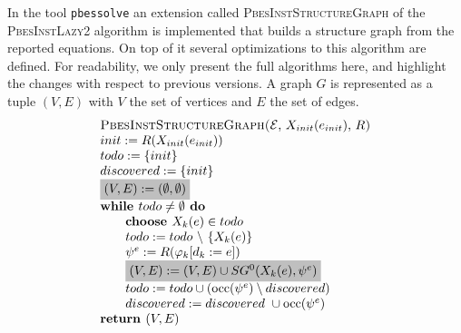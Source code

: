 \documentclass{article}
\newcommand{\Do}{\text{\textbf{ do }}}
\newcommand{\While}{\text{\textbf{while }}}
\newcommand{\Choose}{\text{\textbf{choose }}}
\newcommand{\Return}{\text{\textbf{return }}}
\begin{document}
In the tool \texttt{pbessolve} an extension called \textsc{%
PbesInstStructureGraph} of the \textsc{PbesInstLazy2} algorithm is
implemented that builds a structure graph from the reported equations. On
top of it several optimizations to this algorithm are defined. For
readability, we only present the full algorithms here, and highlight the
changes with respect to previous versions. A graph $G$ is
represented as a tuple $(V,E)$ with $V$ the set of vertices and $E$ the set
of edges.%
\begin{equation*}
\begin{array}{l}
\text{\textsc{PbesInstStructureGraph(}}\mathcal{E}\text{, }X_{init}(e_{init})%
\text{, }R\text{\textsc{)}} \\
init:=R(X_{init}(e_{init})) \\
todo:=\{init\} \\
discovered:=\{init\} \\
\colorbox{lightgray}{$%
(V,E) :=(\emptyset ,\emptyset ) $}\\
\While todo\neq \emptyset \Do \\
\qquad \Choose X_{k}(e)\in todo \\
\qquad todo:=todo\ \backslash \ \{X_{k}(e)\} \\
\qquad \psi ^{e}:=R(\varphi _{k}[d_{k}:=e]) \\
\qquad \colorbox{lightgray}{$%
(V,E) := (V,E) \cup SG^{0}(X_{k}(e),\psi ^{e}) $}\\
\qquad todo:=todo\cup (\mathrm{occ}(\psi ^{e})\setminus discovered) \\
\qquad discovered:=discovered\ \cup \mathrm{occ}(\psi ^{e}) \\
\Return (V, E)%
\end{array}%
\end{equation*}
\end{document}

